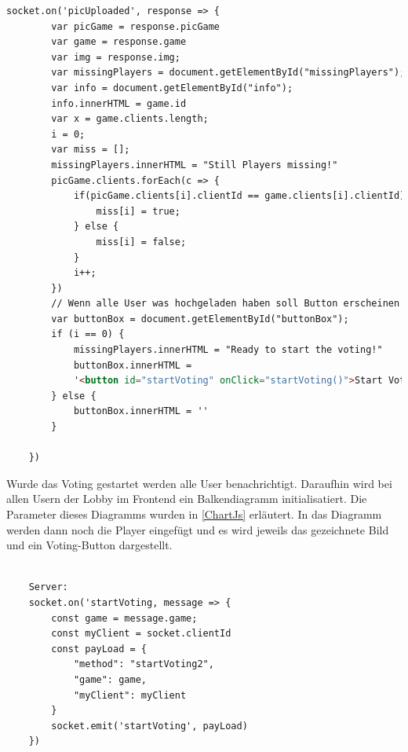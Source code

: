 \begin{lstlisting}[language=html,caption=picUploaded Client]
    socket.on('picUploaded', response => {
        var picGame = response.picGame
        var game = response.game
        var img = response.img;
        var missingPlayers = document.getElementById("missingPlayers");
        var info = document.getElementById("info");
        info.innerHTML = game.id
        var x = game.clients.length;
        i = 0;
        var miss = [];
        missingPlayers.innerHTML = "Still Players missing!"
        picGame.clients.forEach(c => {
            if(picGame.clients[i].clientId == game.clients[i].clientId){
                miss[i] = true;
            } else {
                miss[i] = false;
            }
            i++;
        })
        // Wenn alle User was hochgeladen haben soll Button erscheinen (i=0)
        var buttonBox = document.getElementById("buttonBox");
        if (i == 0) {
            missingPlayers.innerHTML = "Ready to start the voting!"
            buttonBox.innerHTML =
            '<button id="startVoting" onClick="startVoting()">Start Voting</button>'
        } else {
            buttonBox.innerHTML = ''
        }

    })
\end{lstlisting}

Wurde das Voting gestartet werden alle User benachrichtigt.
Daraufhin wird bei allen Usern der Lobby im Frontend ein Balkendiagramm initialisatiert. Die Parameter dieses Diagramms wurden in \ref{ChartJs} erläutert.
In das Diagramm werden dann noch die Player eingefügt und es wird jeweils das gezeichnete Bild und ein Voting-Button dargestellt.
\begin{lstlisting}[language=html,caption=Start Voting Server]
    
    Server:
    socket.on('startVoting, message => {
        const game = message.game;
        const myClient = socket.clientId
        const payLoad = {
            "method": "startVoting2",
            "game": game,
            "myClient": myClient
        }
        socket.emit('startVoting', payLoad)
    })

\end{lstlisting}

